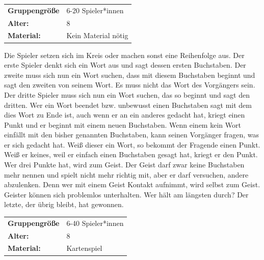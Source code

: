 \begin{table}[H]
\begin{tabular}{>{\bfseries}lp{8cm}}
   Gruppengröße   & 6-20 Spieler*innen\\
    Alter: & 8 \\
    Material: & Kein Material nötig \\
\end{tabular}
\end{table} 
 Die Spieler setzen sich im Kreis oder machen sonst eine Reihenfolge aus. Der erste Spieler denkt sich ein Wort aus und sagt dessen ersten Buchstaben. Der zweite muss sich nun ein Wort suchen, dass mit diesem Buchstaben beginnt und sagt den zweiten von seinem Wort. Es muss nicht das Wort des Vorgängers sein. Der dritte Spieler muss sich nun ein Wort suchen, das so beginnt und sagt den dritten. Wer ein Wort beendet bzw. unbewusst einen Buchstaben sagt mit dem dies Wort zu Ende ist, auch wenn er an ein anderes gedacht hat, kriegt einen Punkt und er beginnt mit einem neuen Buchstaben. Wenn einem kein Wort einfällt mit den bisher genannten Buchstaben, kann seinen Vorgänger fragen, was er sich gedacht hat. Weiß dieser ein Wort, so bekommt der Fragende einen Punkt. Weiß er keines, weil er einfach einen Buchstaben gesagt hat, kriegt er den Punkt. Wer drei Punkte hat, wird zum Geist. Der Geist darf zwar keine Buchstaben mehr nennen und spielt nicht mehr richtig mit, aber er darf versuchen, andere abzulenken. Denn wer mit einem Geist Kontakt aufnimmt, wird selbst zum Geist. Geister können sich problemlos unterhalten. Wer hält am längsten durch? Der letzte, der übrig bleibt, hat gewonnen.\\



\begin{table}[H]
\begin{tabular}{>{\bfseries}lp{8cm}}
   Gruppengröße   & 6-40 Spieler*innen\\
    Alter: & 8 \\
    Material: & Kartenspiel\\
\end{tabular}
\end{table} 

